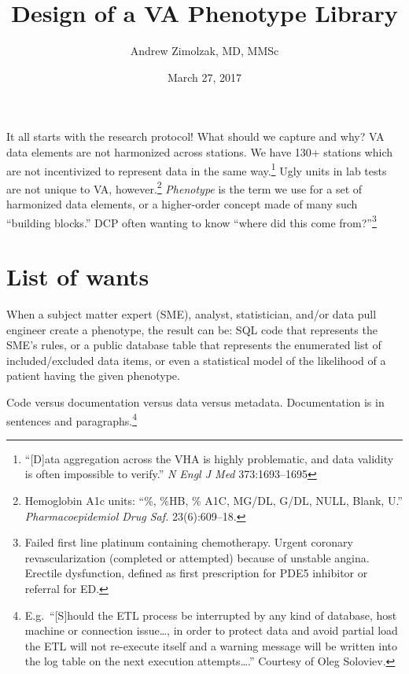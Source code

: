 \documentclass{tufte-handout}
\title{Design of a VA Phenotype Library}
\author{Andrew Zimolzak, MD, MMSc}
\date{March 27, 2017}
\begin{document}
\maketitle

It all starts with the research protocol! What should we capture and
why? VA data elements are not harmonized across stations. We have 130+
stations which are not incentivized to represent data in the same
way.\footnote{``[D]ata aggregation across the VHA is highly
  problematic, and data validity is often impossible to verify.''
  \emph{N Engl J Med} 373:1693--1695} Ugly units in lab tests are not
unique to VA, however.\footnote{Hemoglobin A1c units: ``\%, \%HB, \%
  A1C, MG/DL, G/DL, NULL, Blank, U.'' \emph{Pharmacoepidemiol Drug
    Saf.} 23(6):609--18.} \emph{Phenotype} is the term we use for a
set of harmonized data elements, or a higher-order concept made of
many such ``building blocks.'' DCP often wanting to know ``where did
this come from?''\footnote{Failed first line platinum containing
  chemotherapy. Urgent coronary revascularization (completed or
  attempted) because of unstable angina. Erectile dysfunction, defined
  as first prescription for PDE5 inhibitor or referral for ED.}

\section{List of wants}

When a subject matter expert (SME), analyst, statistician, and/or data
pull engineer create a phenotype, the result can be: SQL code that
represents the SME's rules, or a public database table that represents
the enumerated list of included/excluded data items, or even a
statistical model of the likelihood of a patient having the given
phenotype. 

Code versus documentation versus data versus metadata. Documentation
is in sentences and paragraphs.\footnote{E.g.\ ``[S]hould the ETL
  process be interrupted by any kind of database, host machine or
  connection issue\ldots{}, in order to protect data and avoid partial
  load the ETL will not re-execute itself and a warning message will
  be written into the log table on the next execution
  attempts\ldots{}.'' Courtesy of Oleg Soloviev.}
\end{document}
